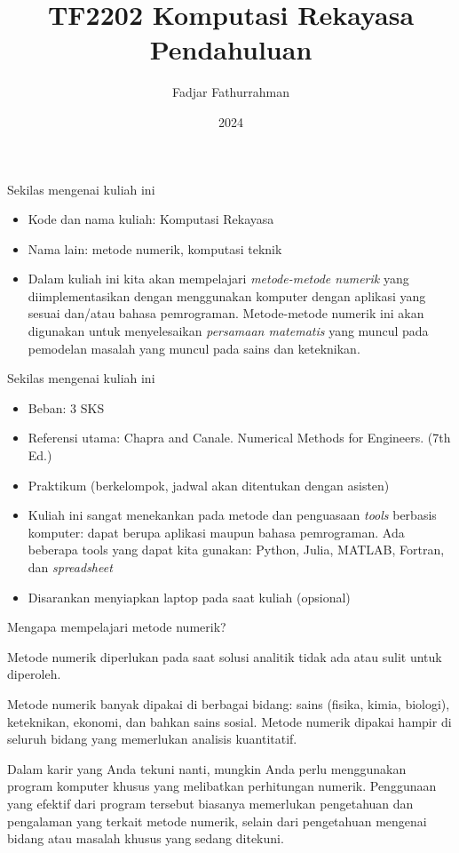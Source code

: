 

\title{TF2202 Komputasi Rekayasa\\
Pendahuluan}
\author{Fadjar Fathurrahman}
\date{2024}



\frame{\titlepage}

\begin{frame}{Sekilas mengenai kuliah ini}

\begin{itemize}
\item Kode dan nama kuliah: Komputasi Rekayasa
\item Nama lain: metode numerik, komputasi teknik
\item Dalam kuliah ini kita akan mempelajari \emph{metode-metode numerik}
  yang diimplementasikan dengan menggunakan komputer dengan aplikasi
  yang sesuai dan/atau bahasa pemrograman. Metode-metode numerik ini
  akan digunakan untuk menyelesaikan \emph{persamaan matematis} yang
  muncul pada pemodelan masalah yang muncul pada sains dan keteknikan.
\end{itemize}
\end{frame}




\begin{frame}{Sekilas mengenai kuliah ini}

\begin{itemize}
\item Beban: 3 SKS
\item Referensi utama: Chapra and Canale. Numerical Methods for Engineers. (7th Ed.)
\item Praktikum (berkelompok, jadwal akan ditentukan dengan asisten)
\item Kuliah ini sangat menekankan pada metode dan penguasaan \textit{tools}
berbasis komputer: dapat berupa aplikasi maupun bahasa pemrograman.
Ada beberapa tools yang dapat kita gunakan: Python, Julia, MATLAB, Fortran, dan
\emph{spreadsheet}
\item Disarankan menyiapkan laptop pada saat kuliah (opsional)
\end{itemize}

\end{frame}


\begin{frame}{Mengapa mempelajari metode numerik?}

Metode numerik diperlukan pada saat solusi analitik tidak ada
atau sulit untuk diperoleh.

Metode numerik banyak dipakai di berbagai bidang: sains (fisika, kimia, biologi),
keteknikan, ekonomi, dan bahkan sains sosial. Metode numerik dipakai
hampir di seluruh bidang yang memerlukan analisis kuantitatif.

Dalam karir yang Anda tekuni nanti, mungkin Anda perlu menggunakan program
komputer khusus yang melibatkan perhitungan numerik. Penggunaan yang efektif
dari program tersebut biasanya memerlukan pengetahuan dan pengalaman
yang terkait metode numerik, selain dari pengetahuan mengenai bidang atau masalah
khusus yang sedang ditekuni.

\end{frame}


